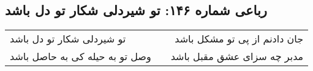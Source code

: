 \begin{center}
\section*{رباعی شماره ۱۴۶: تو شیردلی شکار تو دل باشد}
\label{sec:sh146}
\begin{longtable}{l p{0.5cm} r}
تو شیردلی شکار تو دل باشد
&&
جان دادنم از پی تو مشکل باشد
\\
وصل تو به حیله کی به حاصل باشد
&&
مدبر چه سزای عشق مقبل باشد
\\
\end{longtable}
\end{center}
